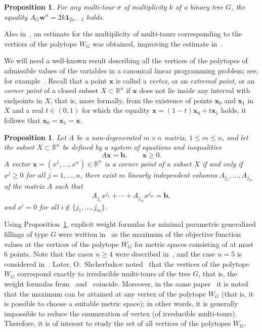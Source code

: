 \documentclass[10pt]{article}
\theoremstyle{plain}
\newtheorem{prop}[thm]{Proposition}
\theoremstyle{definition}
\def\one{\mathbf{1}}
\def\bb{\boldsymbol{b}}
\def\bw{\boldsymbol{w}}
\def\bx{\boldsymbol{x}}
\newcommand{\R}{{\mathbb R}}
\begin{document}
\begin{prop}\label{prop:m_tour_vec}
For any multi-tour $\sigma$ of multiplicity $k$ of a binary tree $G$, the equality $A_G\bw^\sigma=2k\one_{2n-3}$ holds.
\end{prop}

Also in~\cite{IT_LP}, an estimate for the multiplicity of multi-tours corresponding to the vertices of the polytope $W_G$ was obtained, improving the estimate in~\cite{Eremin}.

We will need a well-known result describing all the vertices of the polytopes of admissible values of the variables in a canonical linear programming problem; see, for example~\cite{VasIv}. Recall that a point $\bx$ is called a \emph{vertex}, or an \emph{extremal point}, or an \emph{corner point\/} of a closed subset $X\subset \R^n$ if $\bx$ does not lie inside any interval with endpoints in $X$, that is, more formally, from the existence of points $\bx_0$ and $\bx_1$ in $X$ and a real $t\in(0,1)$ for which the equality $\bx=(1-t)\bx_0+t\bx_1$ holds, it follows that $\bx_0=\bx_1=\bx$.

\begin{prop}\label{prop:Lin_Prog_Vert}
Let $A$ be a non-degenerated $m\times n$ matrix, $1\le m\le n$, and let the subset $X\subset \R^n$ be defined by a system of equations and inequalities
$$
A\bx=\bb,\qquad \bx\ge0.
$$
A vector $\bx=(x^1,\ldots,x^n)\in\R^n$ is a corner point of a subset $X$ if and only if $x^j\ge0$ for all $j=1,\ldots,n$, there exist $m$ linearly independent columns $A_{j_1},\ldots,A_{j_m}$ of the matrix $A$ such that
$$
A_{j_1}x^{j_1}+\cdots+A_{j_m}x^{j_m}=\bb,
$$
and $x^i=0$ for all $i\not\in\{j_1,\ldots,j_m\}$.
\end{prop}

Using Proposition~\ref{prop:Lin_Prog_Vert}, explicit weight formulas for minimal parametric generalized fillings of type $G$ were written in~\cite{IT_LP} as the maximum of the objective function values at the vertices of the polytope $W_G$ for metric spaces consisting of at most $6$ points. Note that the cases $n\ge 4$ were described in~\cite{IT_MSb}, and the case $n=5$ is considered in~\cite{BBed}. Later, O.~Shcherbakov noted~\cite{Shch1} that the vertices of the polytope $W_G$ correspond exactly to irreducible multi-tours of the tree $G$, that is, the weight formulas from~\cite{Eremin} and~\cite{IT_LP} coincide. Moreover, in the same paper~\cite{Shch1} it is noted that the maximum can be attained at any vertex of the polytope $W_G$ (that is, it is possible to choose a suitable metric space); in other words, it is generally impossible to reduce the enumeration of vertex (of irreducible multi-tours). Therefore, it is of interest to study the set of all vertices of the polytopes $W_G$.
\end{document}

